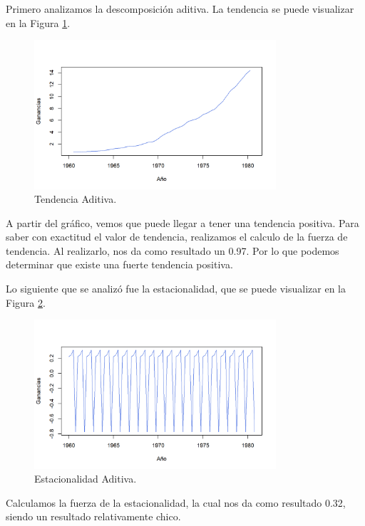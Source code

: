 \documentclass{article} %
\begin{document}
Primero analizamos la descomposición aditiva. La tendencia se puede visualizar en la Figura \ref{fig:TendenciaAditiva}.

\begin{figure}[H]
	\centering
	\includegraphics[width=0.8\textwidth]{images/4-2 Tendencia Aditiva}
	\caption{Tendencia Aditiva.}
	\label{fig:TendenciaAditiva}
\end{figure} 

A partir del gráfico, vemos que puede llegar a tener una tendencia positiva. Para saber con exactitud el valor de tendencia, realizamos el calculo de la fuerza de tendencia. Al realizarlo, nos da como resultado un 0.97. Por lo que podemos determinar que existe una fuerte tendencia positiva.

Lo siguiente que se analizó fue la estacionalidad, que se puede visualizar en la Figura \ref{fig:EstacionalidadAditiva}.

\begin{figure}[H]
	\centering
	\includegraphics[width=0.8\textwidth]{images/4-3 Estacionalidad Aditiva}
	\caption{Estacionalidad Aditiva.}
	\label{fig:EstacionalidadAditiva}
\end{figure} 

Calculamos la fuerza de la estacionalidad, la cual nos da como resultado 0.32, siendo un resultado relativamente chico.
\end{document}
